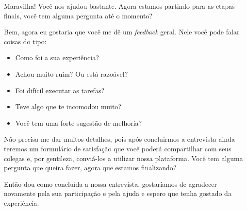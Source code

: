 Maravilha! Você nos ajudou bastante. Agora estamos partindo para as etapas finais, você tem alguma pergunta até o momento? 

Bem, agora eu gostaria que você me dê um \textit{feedback} geral. Nele você pode falar coisas do tipo:
\begin{itemize}
    \item Como foi a sua experiência? 
    \item Achou muito ruim? Ou está razoável? 
    \item Foi difícil executar as tarefas?
    \item Teve algo que te incomodou muito?
    \item Você tem uma forte sugestão de melhoria? 
\end{itemize}

Não precisa me dar muitos detalhes, pois após concluirmos a entrevista ainda teremos um formulário de satisfação que você poderá compartilhar com seus colegas e, por gentileza, conviá-los a utilizar nossa plataforma. Você tem alguma pergunta que queira fazer, agora que estamos finalizando?

Então dou como concluída a nossa entrevista, gostaríamos de agradecer novamente pela sua participação e pela ajuda e espero que tenha gostado da experiência. 
